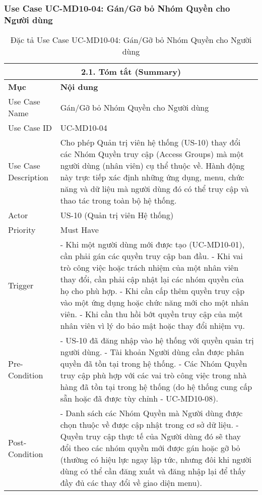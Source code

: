 \subsubsection{Use Case UC-MD10-04: Gán/Gỡ bỏ Nhóm Quyền cho Người dùng}
\begin{longtable}{|m{4cm}|p{11cm}|}
\caption{Đặc tả Use Case UC-MD10-04: Gán/Gỡ bỏ Nhóm Quyền cho Người dùng} \label{tab:uc_md10_04_full_v2_latex_fixed_in_codeblock} \\
\hline
\multicolumn{2}{|c|}{\textbf{2.1. Tóm tắt (Summary)}} \\
\hline
\textbf{Mục} & \textbf{Nội dung} \\
\hline
\endhead %
\midrule
\endfoot %
\bottomrule
\endlastfoot %
Use Case Name & Gán/Gỡ bỏ Nhóm Quyền cho Người dùng \\
\hline
Use Case ID & UC-MD10-04 \\
\hline
Use Case Description & Cho phép Quản trị viên hệ thống (US-10) thay đổi các Nhóm Quyền truy cập (Access Groups) mà một người dùng (nhân viên) cụ thể thuộc về. Hành động này trực tiếp xác định những ứng dụng, menu, chức năng và dữ liệu mà người dùng đó có thể truy cập và thao tác trong toàn bộ hệ thống. \\
\hline
Actor & US-10 (Quản trị viên Hệ thống) \\
\hline
Priority & Must Have \\
\hline
Trigger & - Khi một người dùng mới được tạo (UC-MD10-01), cần phải gán các quyền truy cập ban đầu. \newline - Khi vai trò công việc hoặc trách nhiệm của một nhân viên thay đổi, cần phải cập nhật lại các nhóm quyền của họ cho phù hợp. \newline - Khi cần cấp thêm quyền truy cập vào một ứng dụng hoặc chức năng mới cho một nhân viên. \newline - Khi cần thu hồi bớt quyền truy cập của một nhân viên vì lý do bảo mật hoặc thay đổi nhiệm vụ. \\
\hline
Pre-Condition & - US-10 đã đăng nhập vào hệ thống với quyền quản trị người dùng. \newline - Tài khoản Người dùng cần được phân quyền đã tồn tại trong hệ thống. \newline - Các Nhóm Quyền truy cập phù hợp với các vai trò công việc trong nhà hàng đã tồn tại trong hệ thống (do hệ thống cung cấp sẵn hoặc đã được tùy chỉnh - UC-MD10-08). \\
\hline
Post-Condition & - Danh sách các Nhóm Quyền mà Người dùng được chọn thuộc về được cập nhật trong cơ sở dữ liệu. \newline - Quyền truy cập thực tế của Người dùng đó sẽ thay đổi theo các nhóm quyền mới được gán hoặc gỡ bỏ (thường có hiệu lực ngay lập tức, nhưng đôi khi người dùng có thể cần đăng xuất và đăng nhập lại để thấy đầy đủ các thay đổi về giao diện menu). \\

\end{longtable}
